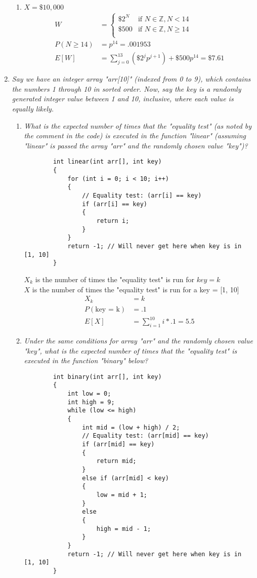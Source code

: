 \documentclass{article} %
\begin{document}
\begin{enumerate}
\begin{enumerate}
		\item $X = \$10,000$
		\begin{align*}
		W &= 
			\begin{cases}
			\$2^N &\text{if } N \in \mathbb{Z}, N < 14\\
			\$500 &\text{if } N \in \mathbb{Z}, N \geq 14\\
			\end{cases}\\
		P(N \geq 14) &= p^{14} = .001953\\
		E[W] &= \sum_{j=0}^{13} (\$2^j p^{j+1}) + \$500p^{14} = \$7.61
		\end{align*}
				
	\end{enumerate}
	
	\item \textit{Say we have an integer array "arr[10]" (indexed from 0 to 9), which contains the numbers 1 through 10 in sorted order. Now, say the key is a randomly generated integer value between 1 and 10, inclusive, where each value is equally likely.}
	\begin{enumerate}
		\item \textit{What is the expected number of times that the "equality test" (as noted by the comment in the code) is executed in the function "linear" (assuming "linear" is passed the array "arr" and the randomly chosen value "key")?}
		\begin{lstlisting}
		int linear(int arr[], int key)
		{
			for (int i = 0; i < 10; i++)
			{
				// Equality test: (arr[i] == key)
				if (arr[i] == key)
				{
					return i;
				}
			}
			return -1; // Will never get here when key is in [1, 10]
		}
		\end{lstlisting}
		
		$X_k$ is the number of times the "equality test" is run for $key = k$\\
		$X$ is the number of times the "equality test" is run for a key = [1, 10]
		\begin{align*}
		X_k &= k\\
		P(\text{key = k}) &= .1\\
		E[X] &= \sum_{i=1}^{10} i * .1 = 5.5
		\end{align*}
		
		\item \textit{Under the same conditions for array "arr" and the randomly chosen value "key", what is the expected number of times that the "equality test" is executed in the function "binary" below?}
		\begin{lstlisting}
		int binary(int arr[], int key)
		{
			int low = 0;
			int high = 9;
			while (low <= high)
			{
				int mid = (low + high) / 2;
				// Equality test: (arr[mid] == key)
				if (arr[mid] == key)
				{
					return mid;
				}
				else if (arr[mid] < key)
				{
					low = mid + 1;
				}
				else 
				{
					high = mid - 1;
				}
			}
			return -1; // Will never get here when key is in [1, 10]
		}
		\end{lstlisting}		
				

\end{enumerate}
\end{enumerate}
\end{document}
